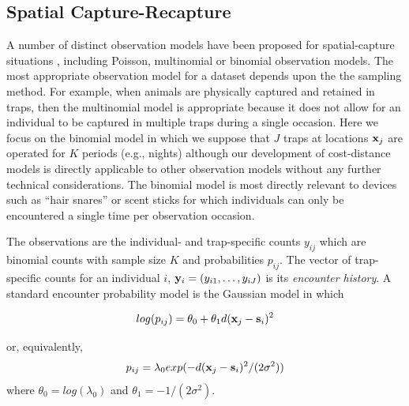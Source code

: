 \documentclass[12pt]{article}
\begin{document}
\begin{spacing}{1.8}
\section{Spatial Capture-Recapture}

A number of distinct observation models have been proposed for
spatial-capture situations \citep{borchers_efford:2008,
  royle_etal:2009ecol, efford_etal:2009ecol}, including Poisson,
multinomial or binomial observation models. The most appropriate
observation model for a dataset depends upon the the sampling method.
For example, when animals are physically captured and retained in
traps, then the multinomial model is appropriate because it does not
allow for an individual to be captured in multiple traps during a
single occasion. Here we focus on the binomial model in which we
suppose that $J$ traps at locations ${\bf x}_{j}$ are operated for $K$
periods (e.g., nights) although our development of cost-distance
models is directly applicable to other observation models without any
further technical considerations. The binomial model is most directly
relevant to devices such as ``hair snares''
\citep{woods_etal:1999,gardner_etal:2010} or scent sticks
\citep{kery_etal:2010} for which individuals can only be encountered a
single time per observation occasion.

The observations are the individual- and trap-specific counts $y_{ij}$
which are binomial counts with sample size $K$ and probabilities
$p_{ij}$. The vector of trap-specific counts for an individual $i$,
 ${\bf y}_{i} = (y_{i1},\ldots,y_{iJ})$ is its {\it encounter history}.
A standard encounter probability model
\citep{borchers_efford:2008} is the Gaussian model in which

\begin{equation}
log(p_{ij})= \theta_{0} + \theta_{1} d({\bf x}_{j} - {\bf s}_{i})^{2}
\label{eq.encounter}
\end{equation}

{\flushleft or, equivalently, }
\[
p_{ij} = \lambda_{0} exp(-  d({\bf x}_{j} - {\bf s}_{i})^{2}
/(2\sigma^{2}) )
\]
where $\theta_{0} = log(\lambda_{0})$ and $\theta_{1} =
-1/(2\sigma^2)$.



\end{spacing}
\end{document}
